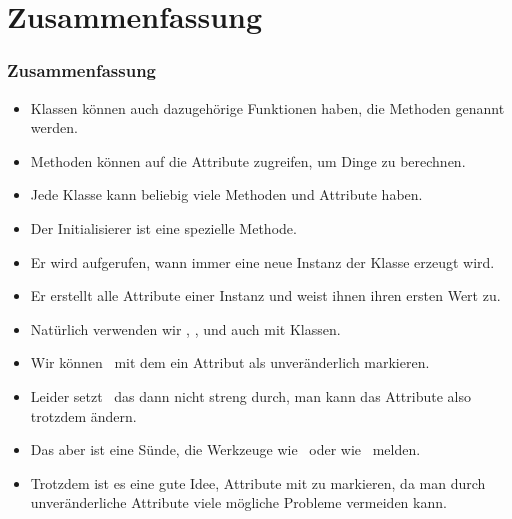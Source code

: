 \documentclass[aspectratio=169,mathserif,notheorems]{beamer}%
\begin{document}
\section{Zusammenfassung}%
%
\begin{frame}[t]%
\frametitle{Zusammenfassung}%
%
\begin{itemize}%
%
%
%
%
\item<4-> Klassen können auch dazugehörige Funktionen haben, die Methoden genannt werden.%
%
\item<5-> Methoden können auf die Attribute zugreifen, um Dinge zu berechnen.
%
\item<6-> Jede Klasse kann beliebig viele Methoden und Attribute haben.%
%
\item<7-> Der Initialisierer  ist eine spezielle Methode.%
%
\item<8-> Er wird aufgerufen, wann immer eine neue Instanz der Klasse erzeugt wird.%
%
\item<9-> Er erstellt alle Attribute einer Instanz und weist ihnen ihren ersten Wert zu.%
%
\item<10-> Natürlich verwenden wir , , und  auch mit Klassen.%
%
\item<11-> Wir können \DEzB\ mit dem   ein Attribut als unveränderlich markieren.%
%
\item<12-> Leider setzt \python\ das dann nicht streng durch, man kann das Attribute also trotzdem ändern.%
%
\item<13-> Das aber ist eine Sünde, die Werkzeuge wie \mypy\ oder  wie \pycharm\ melden.%
%
\item<14-> Trotzdem ist es eine gute Idee, Attribute mit  zu markieren, da man durch unveränderliche Attribute viele mögliche Probleme vermeiden kann.%
\end{itemize}%
\end{frame}%
%
\endPresentation%
\end{document}
